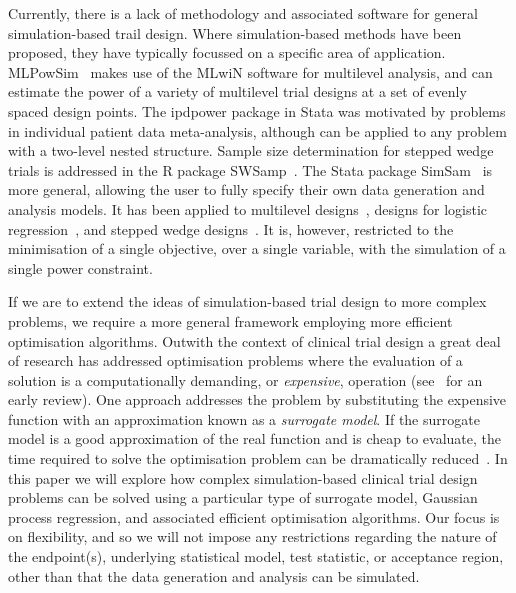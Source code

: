 \documentclass{article} %
\begin{document}

Currently, there is a lack of methodology and associated software for general simulation-based trail design. Where simulation-based methods have been proposed, they have typically focussed on a specific area of application. MLPowSim~\cite{Browne2009} makes use of the MLwiN software for multilevel analysis, and can estimate the power of a variety of multilevel trial designs at a set of evenly spaced design points. The ipdpower package in Stata was motivated by problems in individual patient data meta-analysis, although can be applied to any problem with a two-level nested structure. Sample size determination for stepped wedge trials is addressed in the R package SWSamp~\cite{Baio2015}. The Stata package SimSam~\cite{Hooper2013} is more general, allowing the user to fully specify their own data generation and analysis models. It has been applied to multilevel designs~\cite{Hooper2013}, designs for logistic regression~\cite{Grieve2016}, and stepped wedge designs~\cite{Hooper2016}. It is, however, restricted to the minimisation of a single objective, over a single variable, with the simulation of a single power constraint. 

If we are to extend the ideas of simulation-based trial design to more complex problems, we require a more general framework employing more efficient optimisation algorithms. Outwith the context of clinical trial design a great deal of research has addressed optimisation problems where the evaluation of a solution is a computationally demanding, or \emph{expensive}, operation (see~\cite{Sacks1989} for an early review). One approach addresses the problem by substituting the expensive function with an approximation known as a \emph{surrogate model}. If the surrogate model is a good approximation of the real function and is cheap to evaluate, the time required to solve the optimisation problem can be dramatically reduced~\cite{Jones2001}.  In this paper we will explore how complex simulation-based clinical trial design problems can be solved using a particular type of surrogate model, Gaussian process regression, and associated efficient optimisation algorithms. Our focus is on flexibility, and so we will not impose any restrictions regarding the nature of the endpoint(s), underlying statistical model, test statistic, or acceptance region, other than that the data generation and analysis can be simulated.
\end{document}
